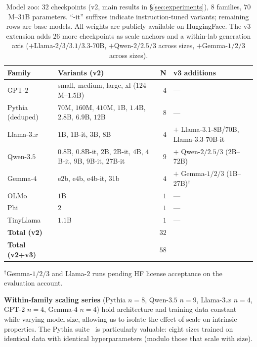 \documentclass[preprint]{neurips_2025}
\begin{document}
\begin{table}[t]
\centering
\caption{Model zoo: $32$ checkpoints (v2, main results in \S\ref{sec:experiments}), $8$ families, $70$M--$31$B parameters. ``-it'' suffixes indicate instruction-tuned variants; remaining rows are base models. All weights are publicly available on HuggingFace. The v3 extension adds $26$ more checkpoints as scale anchors and a within-lab generation axis ($+$Llama-$2/3/3.1/3.3$-$70$B, $+$Qwen-$2/2.5/3$ across sizes, $+$Gemma-$1/2/3$ across sizes).}
\label{tab:models}
\small
\begin{tabular}{@{}llrl@{}}
\toprule
\textbf{Family} & \textbf{Variants (v2)} & \textbf{N} & \textbf{v3 additions} \\
\midrule
GPT-$2$ & small, medium, large, xl ($124$M--$1.5$B) & $4$ & --- \\
Pythia (deduped) & $70$M, $160$M, $410$M, $1$B, $1.4$B, $2.8$B, $6.9$B, $12$B & $8$ & --- \\
Llama-$3.x$ & $1$B, $1$B-it, $3$B, $8$B & $4$ & $+$ Llama-$3.1$-$8$B/$70$B, Llama-$3.3$-$70$B-it \\
Qwen-$3.5$ & $0.8$B, $0.8$B-it, $2$B, $2$B-it, $4$B, $4$B-it, $9$B, $9$B-it, $27$B-it & $9$ & $+$ Qwen-$2/2.5/3$ (2B--72B) \\
Gemma-$4$ & e$2$b, e$4$b, e$4$b-it, $31$b & $4$ & $+$ Gemma-$1/2/3$ (1B--27B)$^\dagger$ \\
OLMo & $1$B & $1$ & --- \\
Phi & $2$ & $1$ & --- \\
TinyLlama & $1.1$B & $1$ & --- \\
\midrule
\textbf{Total (v2)} & & \textbf{$32$} & \\
\textbf{Total (v2+v3)} & & \textbf{$58$} & \\
\bottomrule
\end{tabular}
\begin{flushleft}\footnotesize
$^\dagger$Gemma-$1/2/3$ and Llama-$2$ runs pending HF license acceptance on the evaluation account.
\end{flushleft}
\end{table}

\textbf{Within-family scaling series} (Pythia $n=8$, Qwen-$3.5$ $n=9$, Llama-$3.x$ $n=4$, GPT-$2$ $n=4$, Gemma-$4$ $n=4$) hold architecture and training data constant while varying model size, allowing us to isolate the effect of scale on intrinsic properties.
The Pythia suite~\citep{biderman2023pythia} is particularly valuable: eight sizes trained on identical data with identical hyperparameters (modulo those that scale with size).
\end{document}
